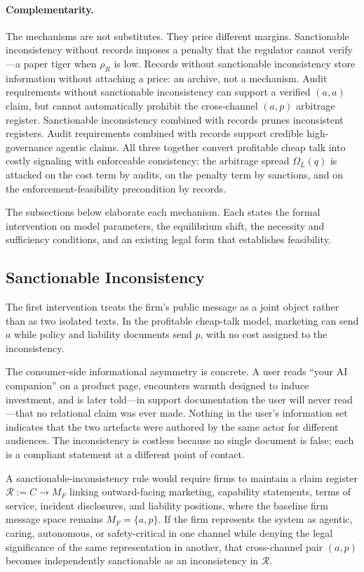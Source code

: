 \documentclass[review,authoryear]{elsarticle}
\theoremstyle{definition}
\theoremstyle{plain}
\begin{document}
\paragraph{Complementarity.}
The mechanisms are not substitutes.  They price different margins.
Sanctionable inconsistency without records imposes a penalty that the regulator
cannot verify---a paper tiger when $\rho_R$ is low.  Records without
sanctionable inconsistency store information without attaching a price:
an archive, not a mechanism.  Audit requirements without sanctionable
inconsistency can support a verified $(a,a)$ claim, but cannot automatically
prohibit the cross-channel $(a,p)$ arbitrage register.  Sanctionable
inconsistency combined with records prunes inconsistent registers.  Audit
requirements combined with records support credible high-governance agentic
claims.  All three together convert profitable cheap talk into costly signaling
with enforceable consistency: the arbitrage spread $\Omega_L(q)$ is attacked on
the cost term by audits, on the penalty term by sanctions, and on the
enforcement-feasibility precondition by records.

The subsections below elaborate each mechanism.  Each states the formal
intervention on model parameters, the equilibrium shift, the necessity and
sufficiency conditions, and an existing legal form that establishes
feasibility.

\subsection{Sanctionable Inconsistency}
\label{subsec:sanctionable-inconsistency}

The first intervention treats the firm's public message as a joint object rather
than as two isolated texts. In the profitable cheap-talk model, marketing can send $a$
while policy and liability documents send $p$, with no cost assigned to the
inconsistency.

The consumer-side informational asymmetry is concrete. A user reads ``your AI companion'' on a product page, encounters warmth designed to induce investment, and is later told---in support documentation the user will never read---that no relational claim was ever made. Nothing in the user's information set indicates that the two artefacts were authored by the same actor for different audiences. The inconsistency is costless because no single document is false; each is a compliant statement at a different point of contact.

A sanctionable-inconsistency rule would require firms to maintain
a claim register $\mathcal{R} := C \to M_F$ linking outward-facing
marketing, capability statements, terms of service, incident disclosures, and
liability positions, where the baseline firm message space remains
$M_F=\{a,p\}$. If the firm represents the system as agentic, caring, autonomous,
or safety-critical in one channel while denying the legal significance of the
same representation in another, that cross-channel pair $(a,p)$ becomes
independently sanctionable as an inconsistency in $\mathcal{R}$.
\end{document}
